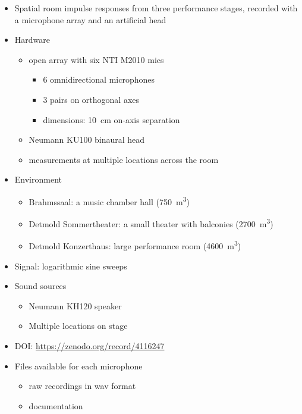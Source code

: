 \documentclass[14pt, oneside]{extarticle}
\begin{document}
\begin{itemize}

\item Spatial room impulse responses from three performance stages, recorded with a microphone array and an artificial head \cite{amengual2020open}

\item Hardware
	\begin{itemize}
	\item open array with six NTI M2010 mics
		\begin{itemize}
		\item 6 omnidirectional microphones 
		\item 3 pairs on orthogonal axes	
		\item dimensions: \SI{10}{\centi\metre} on-axis separation
		\end{itemize}
	\item Neumann KU100 binaural head
	\item measurements at multiple locations across the room
	\end{itemize}

\item Environment
	\begin{itemize}
	\item Brahmssaal: a music chamber hall (\SI{750}{\cubic\metre})
	\item Detmold Sommertheater: a small theater with balconies (\SI{2700}{\cubic\metre})
	\item Detmold Konzerthaus: large performance room (\SI{4600}{\cubic\metre})
	\end{itemize}

\item Signal: logarithmic sine sweeps

\item Sound sources
	\begin{itemize}
	\item Neumann KH120 speaker
	\item Multiple locations on stage
	\end{itemize}

\item DOI: \href{10.5281/zenodo.4116247}{https://zenodo.org/record/4116247} 

\item Files available for each microphone
	\begin{itemize}
	\item raw recordings in wav format
	\item documentation
	\end{itemize}

\end{itemize}
\end{document}
